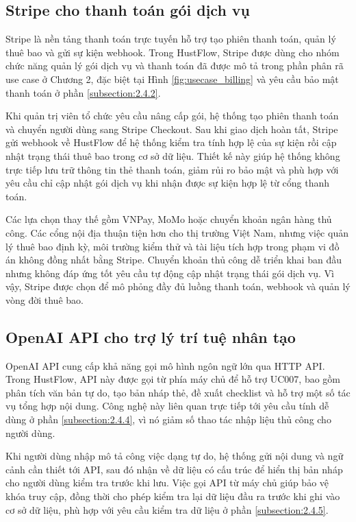 \documentclass[../DoAn.tex]{subfiles}
\begin{document}
\subsection{Stripe cho thanh toán gói dịch vụ}
\label{subsection:3.2.5}

Stripe \cite{stripe} là nền tảng thanh toán trực tuyến hỗ trợ tạo phiên thanh toán, quản lý thuê bao và gửi sự kiện webhook. Trong HustFlow, Stripe được dùng cho nhóm chức năng quản lý gói dịch vụ và thanh toán đã được mô tả trong phần phân rã use case ở Chương 2, đặc biệt tại Hình \ref{fig:usecase_billing} và yêu cầu bảo mật thanh toán ở phần \ref{subsection:2.4.2}.

Khi quản trị viên tổ chức yêu cầu nâng cấp gói, hệ thống tạo phiên thanh toán và chuyển người dùng sang Stripe Checkout. Sau khi giao dịch hoàn tất, Stripe gửi webhook về HustFlow để hệ thống kiểm tra tính hợp lệ của sự kiện rồi cập nhật trạng thái thuê bao trong cơ sở dữ liệu. Thiết kế này giúp hệ thống không trực tiếp lưu trữ thông tin thẻ thanh toán, giảm rủi ro bảo mật và phù hợp với yêu cầu chỉ cập nhật gói dịch vụ khi nhận được sự kiện hợp lệ từ cổng thanh toán.

Các lựa chọn thay thế gồm VNPay, MoMo hoặc chuyển khoản ngân hàng thủ công. Các cổng nội địa thuận tiện hơn cho thị trường Việt Nam, nhưng việc quản lý thuê bao định kỳ, môi trường kiểm thử và tài liệu tích hợp trong phạm vi đồ án không đồng nhất bằng Stripe. Chuyển khoản thủ công dễ triển khai ban đầu nhưng không đáp ứng tốt yêu cầu tự động cập nhật trạng thái gói dịch vụ. Vì vậy, Stripe được chọn để mô phỏng đầy đủ luồng thanh toán, webhook và quản lý vòng đời thuê bao.

\subsection{OpenAI API cho trợ lý trí tuệ nhân tạo}
\label{subsection:3.2.6}

OpenAI API \cite{openai} cung cấp khả năng gọi mô hình ngôn ngữ lớn qua HTTP API. Trong HustFlow, API này được gọi từ phía máy chủ để hỗ trợ UC007, bao gồm phân tích văn bản tự do, tạo bản nháp thẻ, đề xuất checklist và hỗ trợ một số tác vụ tổng hợp nội dung. Công nghệ này liên quan trực tiếp tới yêu cầu tính dễ dùng ở phần \ref{subsection:2.4.4}, vì nó giảm số thao tác nhập liệu thủ công cho người dùng.

Khi người dùng nhập mô tả công việc dạng tự do, hệ thống gửi nội dung và ngữ cảnh cần thiết tới API, sau đó nhận về dữ liệu có cấu trúc để hiển thị bản nháp cho người dùng kiểm tra trước khi lưu. Việc gọi API từ máy chủ giúp bảo vệ khóa truy cập, đồng thời cho phép kiểm tra lại dữ liệu đầu ra trước khi ghi vào cơ sở dữ liệu, phù hợp với yêu cầu kiểm tra dữ liệu ở phần \ref{subsection:2.4.5}.
\end{document}
